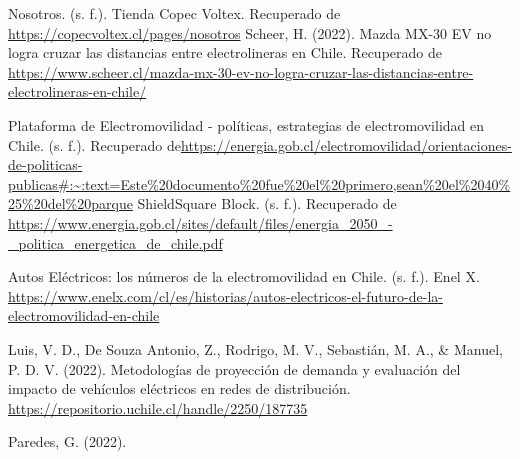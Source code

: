 \documentclass[letterpaper]{article}
\begin{document}
\begin{flushleft}
\begin{thebibliography}{9}
	Nosotros. (s. f.). Tienda Copec Voltex. Recuperado de \url{https://copecvoltex.cl/pages/nosotros}
	Scheer, H. (2022). Mazda MX-30 EV no logra cruzar las distancias entre electrolineras en Chile. Recuperado de \url{https://www.scheer.cl/mazda-mx-30-ev-no-logra-cruzar-las-distancias-entre-electrolineras-en-chile/}

	Plataforma de Electromovilidad - políticas, estrategias de electromovilidad en Chile. (s. f.). Recuperado de\url{https://energia.gob.cl/electromovilidad/orientaciones-de-politicas-publicas#:~:text=Este%20documento%20fue%20el%20primero,sean%20el%2040%25%20del%20parque}
	ShieldSquare Block. (s. f.). Recuperado de \url{https://www.energia.gob.cl/sites/default/files/energia_2050_-_politica_energetica_de_chile.pdf}

	Autos Eléctricos: los números de la electromovilidad en Chile. (s. f.). Enel X. \url{https://www.enelx.com/cl/es/historias/autos-electricos-el-futuro-de-la-electromovilidad-en-chile}

	Luis, V. D., De Souza Antonio, Z., Rodrigo, M. V., Sebastián, M. A., \& Manuel, P. D. V. (2022). Metodologías de proyección de demanda y evaluación del impacto de vehículos eléctricos en redes de distribución. \url{https://repositorio.uchile.cl/handle/2250/187735}

	Paredes, G. (2022).
	\end{thebibliography}


	\end{flushleft}
\end{document}
